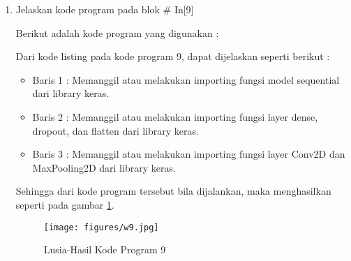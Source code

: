 \begin{enumerate}
\item Jelaskan kode program pada blok \# In[9]
	\par Berikut adalah kode program yang digunakan :
	
	\par Dari kode listing pada kode program 9, dapat dijelaskan seperti berikut :
	\begin{itemize}
	\item Baris 1	: Memanggil atau melakukan importing fungsi model sequential dari library keras.
	\item Baris 2	: Memanggil atau melakukan importing fungsi layer dense, dropout, dan flatten dari library keras.
	\item Baris 3	: Memanggil atau melakukan importing fungsi layer Conv2D dan MaxPooling2D dari library keras.
	\end{itemize}
	\par Sehingga dari kode program tersebut bila dijalankan, maka menghasilkan seperti pada gambar \ref{7B9}.
		\begin{figure}[!hbtp]
		\centering
		\texttt{[image: figures/w9.jpg]}
		\caption{Lusia-Hasil Kode Program 9}
		\label{7B9}
		\end{figure}


\end{enumerate}
